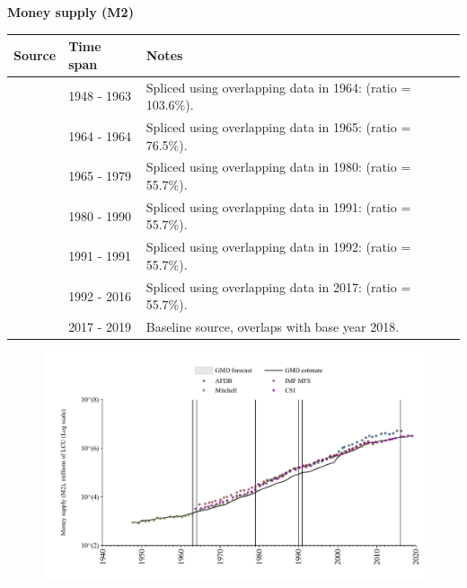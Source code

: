 \documentclass[12pt,a4paper,landscape]{article}
\begin{document}
\begin{adjustbox}{max totalsize={\paperwidth}{\paperheight},center}
\begin{minipage}[t][\textheight][t]{\textwidth}
\vspace*{0.5cm}
{}
\begin{center}
{\Large\bfseries Money supply (M2)}
\end{center}
\vspace{0.5cm}
\begin{table}[H]
\centering
\small
\begin{tabular}{|l|l|l|}
\hline
\textbf{Source} & \textbf{Time span} & \textbf{Notes} \\
\hline
\rowcolor{white}\cite{Mitchell}& 1948 - 1963 &Spliced using overlapping data in 1964: (ratio = 103.6\%). \\
\rowcolor{lightgray}\cite{CS1_ZAF}& 1964 - 1964 &Spliced using overlapping data in 1965: (ratio = 76.5\%). \\
\rowcolor{white}\cite{IMF_MFS}& 1965 - 1979 &Spliced using overlapping data in 1980: (ratio = 55.7\%). \\
\rowcolor{lightgray}\cite{AFDB}& 1980 - 1990 &Spliced using overlapping data in 1991: (ratio = 55.7\%). \\
\rowcolor{white}\cite{IMF_MFS}& 1991 - 1991 &Spliced using overlapping data in 1992: (ratio = 55.7\%). \\
\rowcolor{lightgray}\cite{AFDB}& 1992 - 2016 &Spliced using overlapping data in 2017: (ratio = 55.7\%). \\
\rowcolor{white}\cite{CS1_ZAF}& 2017 - 2019 &Baseline source, overlaps with base year 2018. \\
\hline
\end{tabular}
\end{table}
\begin{figure}[H]
\centering
\includegraphics[width=\textwidth,height=0.6\textheight,keepaspectratio]{graphs/ZAF_M2.pdf}
\end{figure}
\end{minipage}
\end{adjustbox}
\end{document}
